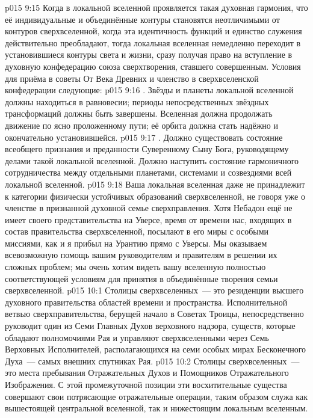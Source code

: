 \vs p015 9:15 \pc Когда в локальной вселенной проявляется такая духовная гармония, что её индивидуальные и объединённые контуры становятся неотличимыми от контуров сверхвселенной, когда эта идентичность функций и единство служения действительно преобладают, тогда локальная вселенная немедленно переходит в установившиеся контуры света и жизни, сразу получая право на вступление в духовную конфедерацию союза сверхтворения, ставшего совершенным. Условия для приёма в советы От Века Древних и членство в сверхвселенской конфедерации следующие:
\vs p015 9:16 . Звёзды и планеты локальной вселенной должны находиться в равновесии; периоды непосредственных звёздных трансформаций должны быть завершены. Вселенная должна продолжать движение по ясно проложенному пути; её орбита должна стать надёжно и окончательно установившейся.
\vs p015 9:17 . Должно существовать состояние всеобщего признания и преданности Суверенному Сыну Бога, руководящему делами такой локальной вселенной. Должно наступить состояние гармоничного сотрудничества между отдельными планетами, системами и созвездиями всей локальной вселенной.
\vs p015 9:18 \pc Ваша локальная вселенная даже не принадлежит к категории физически устойчивых образований сверхвселенной, не говоря уже о членстве в признанной духовной семье сверхправления. Хотя Небадон ещё не имеет своего представительства на Уверсе, время от времени нас, входящих в состав правительства сверхвселенной, посылают в его миры с особыми миссиями, как и я прибыл на Урантию прямо с Уверсы. Мы оказываем всевозможную помощь вашим руководителям и правителям в решении их сложных проблем; мы очень хотим видеть вашу вселенную полностью соответствующей условиям для принятия в объединённые творения семьи сверхвселенной.
\vs p015 10:1 Столицы сверхвселенных~--- это резиденции высшего духовного правительства областей времени и пространства. Исполнительной ветвью сверхправительства, берущей начало в Советах Троицы, непосредственно руководит один из Семи Главных Духов верховного надзора, существ, которые обладают полномочиями Рая и управляют сверхвселенными через Семь Верховных Исполнителей, располагающихся на семи особых мирах Бесконечного Духа~--- самых внешних спутниках Рая.
\vs p015 10:2 Столицы сверхвселенных~--- это места пребывания Отражательных Духов и Помощников Отражательного Изображения. С этой промежуточной позиции эти восхитительные существа совершают свои потрясающие отражательные операции, таким образом служа как вышестоящей центральной вселенной, так и нижестоящим локальным вселенным.
